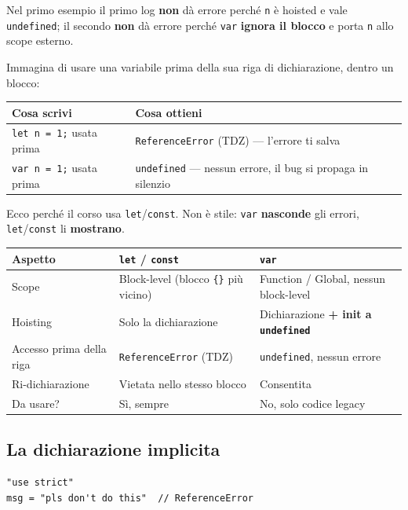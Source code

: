 \documentclass[10pt,a4paper]{article}
\begin{document}
Nel primo esempio il primo log \textbf{non} dà errore perché \texttt{n} è hoisted e vale \texttt{undefined}; il secondo \textbf{non} dà errore perché \texttt{var} \textbf{ignora il blocco} e porta \texttt{n} allo scope esterno.

Immagina di usare una variabile prima della sua riga di dichiarazione, dentro un blocco:

\begin{center}
\small
\begin{tabularx}{\textwidth}{@{}lX@{}}
\toprule
\textbf{Cosa scrivi} & \textbf{Cosa ottieni} \\
\midrule
\texttt{let n = 1;} usata prima & \texttt{ReferenceError} (TDZ) --- l'errore ti salva \\
\texttt{var n = 1;} usata prima & \texttt{undefined} --- nessun errore, il bug si propaga in silenzio \\
\bottomrule
\end{tabularx}
\end{center}

Ecco perché il corso usa \texttt{let}/\texttt{const}. Non è stile: \texttt{var} \textbf{nasconde} gli errori, \texttt{let}/\texttt{const} li \textbf{mostrano}.

\begin{center}
\small
\begin{tabularx}{\textwidth}{@{}lXX@{}}
\toprule
\textbf{Aspetto} & \textbf{\texttt{let} / \texttt{const}} & \textbf{\texttt{var}} \\
\midrule
Scope & Block-level (blocco \texttt{\{\}} più vicino) & Function / Global, nessun block-level \\
Hoisting & Solo la dichiarazione & Dichiarazione \textbf{+ init a \texttt{undefined}} \\
Accesso prima della riga & \texttt{ReferenceError} (TDZ) & \texttt{undefined}, nessun errore \\
Ri-dichiarazione & Vietata nello stesso blocco & Consentita \\
Da usare? & Sì, sempre & No, solo codice legacy \\
\bottomrule
\end{tabularx}
\end{center}

\subsection{La dichiarazione implicita}

\begin{lstlisting}[style=js]
"use strict"
msg = "pls don't do this"  // ReferenceError
\end{lstlisting}
\end{document}
